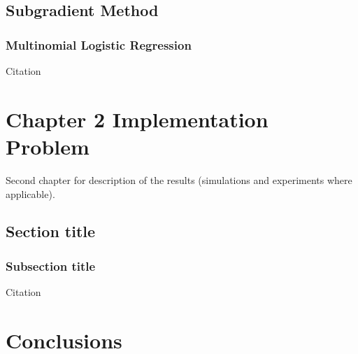 \documentclass[a4paper,11pt,oneside]{book}
\begin{document}
\section{Subgradient Method}
\subsection {Multinomial Logistic Regression}

Citation \cite{CITATION:1}

\chapter{Chapter 2 Implementation Problem}
Second chapter for description of the results (simulations and experiments where
applicable).
\section{Section title}
\subsection {Subsection title}

Citation \cite{CITATION:2}



\chapter*{Conclusions} %


{}
	
\end{document}

